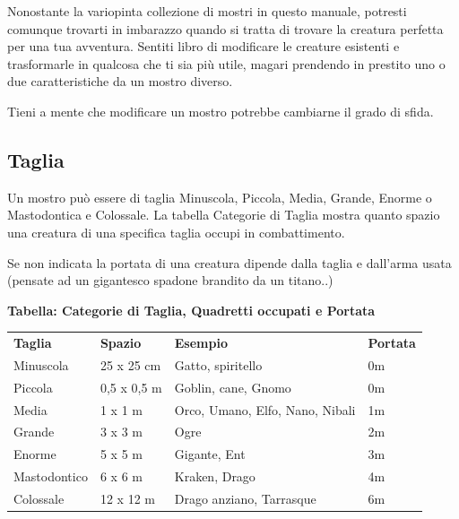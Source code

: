 \begin{multicols}{2}
	Nonostante la variopinta collezione di mostri in questo manuale, potresti comunque trovarti in imbarazzo quando si tratta di trovare la creatura perfetta per una tua avventura. Sentiti libro di modificare le creature esistenti e trasformarle in qualcosa che ti sia più utile, magari prendendo in prestito uno o due caratteristiche da un mostro diverso.

	Tieni a mente che modificare un mostro potrebbe cambiarne il grado di sfida.

	\subsection{Taglia}

	Un mostro può essere di taglia Minuscola, Piccola, Media, Grande, Enorme o Mastodontica e Colossale. La tabella Categorie di Taglia mostra quanto spazio una creatura di una specifica taglia occupi in combattimento.

	Se non indicata la portata di una creatura dipende dalla taglia e dall'arma usata (pensate ad un gigantesco spadone brandito da un titano..)


\end{multicols}

\textbf{Tabella: Categorie di Taglia, Quadretti occupati e Portata}

\medskip

\begin{tabularx}{0.95\textwidth}{llXl}
	\toprule
	\textbf{Taglia}& \textbf{Spazio} & \textbf{Esempio}&\textbf{Portata}\\
	Minuscola & 25 x 25 cm& Gatto, spiritello&0m\\
	Piccola & 0,5 x 0,5 m & Goblin, cane, Gnomo&0m\\
	Media & 1 x 1 m & Orco, Umano, Elfo, Nano, Nibali &1m\\
	Grande & 3 x 3 m& Ogre&2m\\
	Enorme & 5 x 5 m & Gigante, Ent&3m\\
	Mastodontico & 6 x 6 m&Kraken, Drago&4m\\
	Colossale & 12 x 12 m&Drago anziano, Tarrasque&6m\\
\end{tabularx}

\medskip

